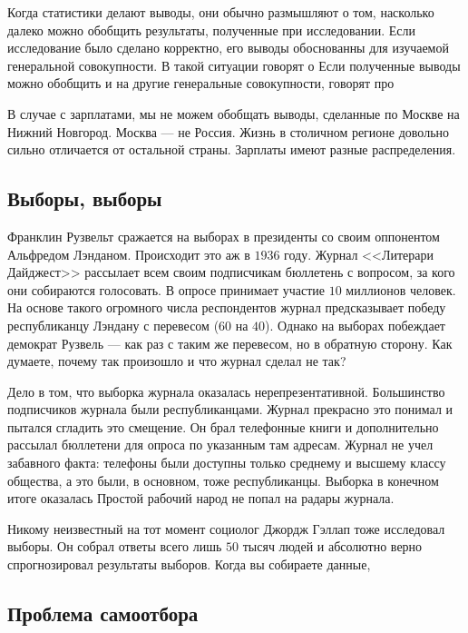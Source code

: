 \documentclass[12pt, a4paper, oneside]{article}
\begin{document}
Когда статистики делают выводы, они обычно размышляют о том, насколько далеко можно обобщить результаты, полученные при исследовании. Если исследование было сделано корректно, его выводы обоснованны для изучаемой генеральной совокупности. В такой ситуации говорят о  Если полученные выводы можно обобщить и на другие генеральные совокупности, говорят про  

В случае с зарплатами, мы не можем обобщать выводы, сделанные по Москве на Нижний Новгород. Москва --- не Россия. Жизнь в столичном регионе довольно сильно отличается от остальной страны. Зарплаты имеют разные распределения. 

\subsection{Выборы, выборы}

Франклин Рузвельт сражается на выборах в президенты со своим оппонентом Альфредом Лэнданом. Происходит это аж в $1936$ году. Журнал <<Литерари Дайджест>> рассылает всем своим подписчикам бюллетень с вопросом, за кого они собираются голосовать. В опросе принимает  участие $10$ миллионов человек. На основе такого огромного числа респондентов журнал предсказывает победу республиканцу Лэндану с перевесом ($60$ на $40$). Однако на выборах побеждает демократ Рузвель --- как раз с таким же перевесом,  но в обратную сторону. Как думаете, почему так произошло и что журнал сделал не так? 

Дело в том, что выборка журнала оказалась нерепрезентативной. Большинство подписчиков журнала были республиканцами. Журнал прекрасно это понимал и пытался сгладить это смещение. Он брал телефонные книги и дополнительно рассылал бюллетени для опроса по указанным там адресам. Журнал не учел забавного факта: телефоны были доступны только среднему и высшему классу общества, а это были, в основном, тоже республиканцы. Выборка в конечном итоге оказалась  Простой рабочий народ не попал на радары журнала. 

Никому неизвестный на тот момент социолог Джордж Гэллап тоже исследовал выборы. Он собрал ответы всего лишь $50$ тысяч людей и абсолютно верно спрогнозировал результаты выборов. Когда вы собираете данные, 


\subsection{Проблема самоотбора}
\end{document}
